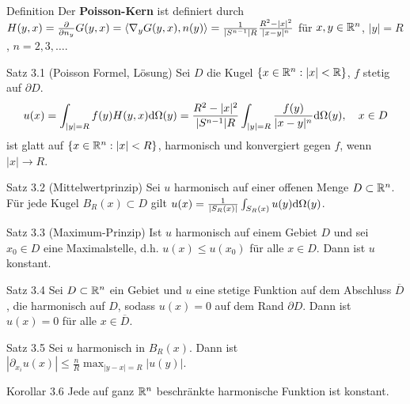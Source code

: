 
\begin{namedtheorem}{Definition}
  Der \textbf{Poisson-Kern} ist definiert durch $H(y,x)=\frac{\partial}{\partial n_y}G(y,x)=\langle \nabla_yG(y,x),n(y) \rangle=\frac1{|S^{n-1}| R}\frac{R^2-|x|^2}{|x-y|^n}$ für $x,y\in\mathbb{R}^n$, $|y|=R$, $n=2,3,\ldots$.
\end{namedtheorem}

\begin{namedtheorem}{Satz 3.1 (Poisson Formel, Lösung)}
  Sei $D$ die Kugel $\{x\in\mathbb{R}^n:|x|<\mathbb{R}\}$, $f$ stetig auf $\partial D$.
  \begin{align*}
  u(x)=\int_{|y|=R} f(y) H(y,x) \mathrm{d}\Omega(y)=\frac{R^2-|x|^2}{|S^{n-1}| R} \int_{|y|=R} \frac{f(y)}{|x-y|^n} \mathrm{d}\Omega(y), \quad x\in D
  \end{align*}
   ist glatt auf $\{x\in\mathbb{R}^n: |x|<R\}$, harmonisch und konvergiert gegen $f$, wenn $|x|\rightarrow R$.
\end{namedtheorem}

\begin{namedtheorem}{Satz 3.2 (Mittelwertprinzip)}
  Sei $u$ harmonisch auf einer offenen Menge $D\subset\mathbb{R}^n$. Für jede Kugel $B_R(x)\subset D$ gilt $u(x)=\frac1{|S_R(x)|}\int_{S_R(x)}u(y)\mathrm{d}\Omega(y)$.
\end{namedtheorem}

\begin{namedtheorem}{Satz 3.3 (Maximum-Prinzip)}
 Ist $u$ harmonisch auf einem Gebiet $D$ und sei $x_0\in D$ eine Maximalstelle, d.h. $u(x)\leq u(x_0)$ für alle $x\in D$. Dann ist $u$ konstant.
\end{namedtheorem}

\begin{namedtheorem}{Satz 3.4}
  Sei $D\subset\mathbb{R}^n$ ein Gebiet und $u$ eine stetige Funktion auf dem Abschluss $\overline{D}$, die harmonisch auf $D$, sodass $u(x)=0$ auf dem Rand $\partial D$. Dann ist $u(x)=0$ für alle $x\in\overline{D}$.
\end{namedtheorem}

\begin{namedtheorem}{Satz 3.5}
  Sei $u$ harmonisch in $B_R(x)$. Dann ist $|\partial_{x_i}u(x)|\leq\frac{n}R \max_{|y-x|=R}|u(y)|$.
\end{namedtheorem}

\begin{namedtheorem}{Korollar 3.6}
Jede auf ganz $\mathbb{R}^n$ beschränkte harmonische Funktion ist konstant.
\end{namedtheorem}

